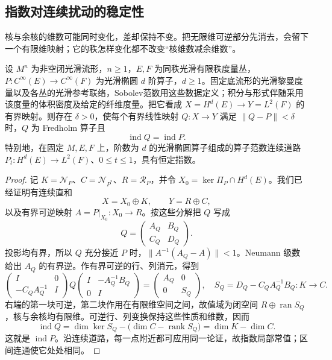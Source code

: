 \subsection{指数对连续扰动的稳定性}
\label{g3:subsec:1302:05}
核与余核的维数可能同时变化，差却保持不变。把无限维可逆部分先消去，会留下一个有限维映射；它的秩怎样变化都不改变“核维数减余维数”。

\begin{theorem}\label{g3:thm:index-local-constancy}
	设 \(M^n\) 为非空闭光滑流形，\(n\ge1\)，\(E,F\) 为同秩光滑有限秩度量丛，\(P:C^\infty(E)\to C^\infty(F)\) 为光滑椭圆 \(d\) 阶算子，\(d\ge1\)。固定底流形的光滑黎曼度量以及各丛的光滑参考联络，Sobolev范数用这些数据定义；积分与形式伴随采用该度量的体积密度及给定的纤维度量。把它看成 \(X=H^d(E)\to Y=L^2(F)\) 的有界映射。则存在 \(\delta>0\)，使每个有界线性映射 \(Q:X\to Y\) 满足 \(\|Q-P\|<\delta\) 时，\(Q\) 为 Fredholm 算子且
	\[
		\operatorname{ind}Q=\operatorname{ind}P.
	\]
	特别地，在固定 \(M,E,F\) 上，阶数为 \(d\) 的光滑椭圆算子组成的算子范数连续道路 \(P_t:H^d(E)\to L^2(F)\)、\(0\le t\le1\)，具有恒定指数。
\end{theorem}
\begin{proof}
	记 \(K=\mathcal N_P\)、\(C=\mathcal N_{P^*}\)、\(R=\mathcal R_P\)，并令 \(X_0=\ker\Pi_P\cap H^d(E)\)。我们已经证明有连续直和
	\[
		X=X_0\oplus K,\qquad Y=R\oplus C,
	\]
	以及有界可逆映射 \(A=P|_{X_0}:X_0\to R\)。按这些分解把 \(Q\) 写成
	\[
		Q=\begin{pmatrix}A_Q&B_Q\\ C_Q&D_Q\end{pmatrix}.
	\]
	投影均有界，所以 \(Q\) 充分接近 \(P\) 时，\(\|A^{-1}(A_Q-A)\|<1\)。Neumann 级数给出 \(A_Q\) 的有界逆。作有界可逆的行、列消元，得到
	\begin{equation}\label{g3:eq:fredholm-block-reduction}
		\begin{pmatrix}I&0\\-C_QA_Q^{-1}&I\end{pmatrix}
		Q
		\begin{pmatrix}I&-A_Q^{-1}B_Q\\0&I\end{pmatrix}
		=\begin{pmatrix}A_Q&0\\0&S_Q\end{pmatrix},
		\quad S_Q=D_Q-C_QA_Q^{-1}B_Q:K\to C.
	\end{equation}
	右端的第一块可逆，第二块作用在有限维空间之间，故值域为闭空间 \(R\oplus\operatorname{ran}S_Q\)，核与余核均有限维。可逆行、列变换保持这些性质和维数，因而
	\[
		\operatorname{ind}Q
		=\dim\ker S_Q-\bigl(\dim C-\operatorname{rank}S_Q\bigr)
		=\dim K-\dim C.
	\]
	这就是 \(\operatorname{ind}P\)。沿连续道路，每一点附近都可应用同一论证，故指数局部常值；区间连通使它处处相同。
\end{proof}

